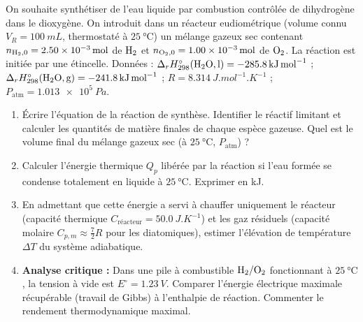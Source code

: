 \documentclass[11pt]{article}
\begin{document}
\begin{exercice}
On souhaite synthétiser de l'eau liquide par combustion contrôlée de dihydrogène dans le dioxygène. On introduit dans un réacteur eudiométrique (volume connu $V_R = \SI{100}{mL}$, thermostaté à $\SI{25}{\celsius}$) un mélange gazeux sec contenant $n_{\ce{H2},0} = \SI{2,50e-3}{mol}$ de $\ce{H2}$ et $n_{\ce{O2},0} = \SI{1,00e-3}{mol}$ de $\ce{O2}$. La réaction est initiée par une étincelle. Données : $\Delta_r H^\circ_{298}(\ce{H2O, l}) = -\SI{285,8}{kJ.mol^{-1}}$ ; $\Delta_r H^\circ_{298}(\ce{H2O, g}) = -\SI{241,8}{kJ.mol^{-1}}$ ; $R = \SI{8,314}{J.mol^{-1}.K^{-1}}$ ; $P_{\text{atm}} = \SI{1,013e5}{Pa}$.
\begin{enumerate}
    \item Écrire l'équation de la réaction de synthèse. Identifier le réactif limitant et calculer les quantités de matière finales de chaque espèce gazeuse. Quel est le volume final du mélange gazeux sec (à $\SI{25}{\celsius}$, $P_{\text{atm}}$) ?
    \item Calculer l'énergie thermique $Q_p$ libérée par la réaction si l'eau formée se condense totalement en liquide à $\SI{25}{\celsius}$. Exprimer en kJ.
    \item En admettant que cette énergie a servi à chauffer uniquement le réacteur (capacité thermique $C_{\text{réacteur}} = \SI{50,0}{J.K^{-1}}$) et les gaz résiduels (capacité molaire $C_{p,m} \approx \frac{7}{2}R$ pour les diatomiques), estimer l'élévation de température $\Delta T$ du système adiabatique.
    \item \textbf{Analyse critique :} Dans une pile à combustible $\ce{H2}/\ce{O2}$ fonctionnant à $\SI{25}{\celsius}$, la tension à vide est $E^\circ = \SI{1,23}{V}$. Comparer l'énergie électrique maximale récupérable (travail de Gibbs) à l'enthalpie de réaction. Commenter le rendement thermodynamique maximal.
\end{enumerate}
\end{exercice}
\end{document}
